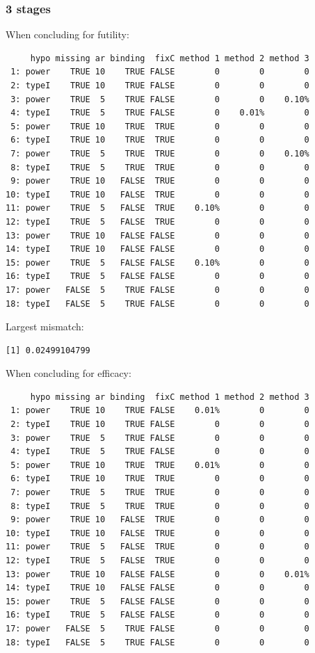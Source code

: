 \documentclass[12pt]{article}
\begin{document}
\clearpage

\subsubsection{3 stages}
\label{sec:org716c857}

When concluding for futility:
\begin{verbatim}
     hypo missing ar binding  fixC method 1 method 2 method 3
 1: power    TRUE 10    TRUE FALSE        0        0        0
 2: typeI    TRUE 10    TRUE FALSE        0        0        0
 3: power    TRUE  5    TRUE FALSE        0        0    0.10%
 4: typeI    TRUE  5    TRUE FALSE        0    0.01%        0
 5: power    TRUE 10    TRUE  TRUE        0        0        0
 6: typeI    TRUE 10    TRUE  TRUE        0        0        0
 7: power    TRUE  5    TRUE  TRUE        0        0    0.10%
 8: typeI    TRUE  5    TRUE  TRUE        0        0        0
 9: power    TRUE 10   FALSE  TRUE        0        0        0
10: typeI    TRUE 10   FALSE  TRUE        0        0        0
11: power    TRUE  5   FALSE  TRUE    0.10%        0        0
12: typeI    TRUE  5   FALSE  TRUE        0        0        0
13: power    TRUE 10   FALSE FALSE        0        0        0
14: typeI    TRUE 10   FALSE FALSE        0        0        0
15: power    TRUE  5   FALSE FALSE    0.10%        0        0
16: typeI    TRUE  5   FALSE FALSE        0        0        0
17: power   FALSE  5    TRUE FALSE        0        0        0
18: typeI   FALSE  5    TRUE FALSE        0        0        0
\end{verbatim}

Largest mismatch:
\begin{verbatim}
[1] 0.02499104799
\end{verbatim}



When concluding for efficacy:
\begin{verbatim}
     hypo missing ar binding  fixC method 1 method 2 method 3
 1: power    TRUE 10    TRUE FALSE    0.01%        0        0
 2: typeI    TRUE 10    TRUE FALSE        0        0        0
 3: power    TRUE  5    TRUE FALSE        0        0        0
 4: typeI    TRUE  5    TRUE FALSE        0        0        0
 5: power    TRUE 10    TRUE  TRUE    0.01%        0        0
 6: typeI    TRUE 10    TRUE  TRUE        0        0        0
 7: power    TRUE  5    TRUE  TRUE        0        0        0
 8: typeI    TRUE  5    TRUE  TRUE        0        0        0
 9: power    TRUE 10   FALSE  TRUE        0        0        0
10: typeI    TRUE 10   FALSE  TRUE        0        0        0
11: power    TRUE  5   FALSE  TRUE        0        0        0
12: typeI    TRUE  5   FALSE  TRUE        0        0        0
13: power    TRUE 10   FALSE FALSE        0        0    0.01%
14: typeI    TRUE 10   FALSE FALSE        0        0        0
15: power    TRUE  5   FALSE FALSE        0        0        0
16: typeI    TRUE  5   FALSE FALSE        0        0        0
17: power   FALSE  5    TRUE FALSE        0        0        0
18: typeI   FALSE  5    TRUE FALSE        0        0        0
\end{verbatim}
\end{document}
